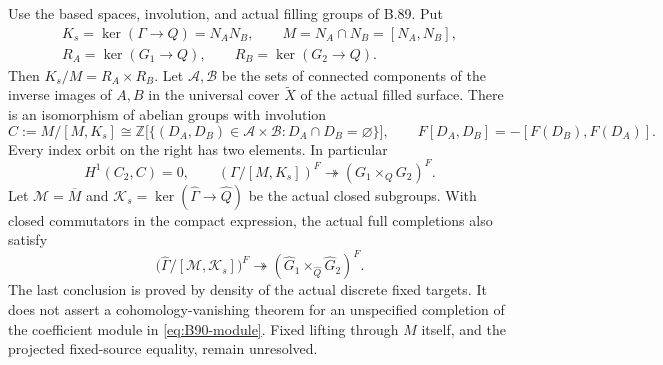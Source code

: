 \label{stmt:B90}
Use the based spaces, involution, and actual filling groups of B.89. Put
\[
 \begin{gathered}
 K_s=\ker(\Gamma\to Q)=N_A N_B,\qquad
 M=N_A\cap N_B=[N_A,N_B],\\
 R_A=\ker(G_1\to Q),\qquad R_B=\ker(G_2\to Q).
 \end{gathered}
\]
Then $K_s/M=R_A\times R_B$. Let $\mathscr A,\mathscr B$ be the
sets of connected components of the inverse images of $A,B$ in the
universal cover $\widetilde X$ of the actual filled surface. There is
an isomorphism of abelian groups with involution
\begin{equation}\label{eq:B90-module}
 C:=M/[M,K_s]\cong
 \mathbb Z\bigl[\{(D_A,D_B)\in\mathscr A\times\mathscr B:
                         D_A\cap D_B=\varnothing\}\bigr],
 \qquad F[D_A,D_B]=-[F(D_B),F(D_A)].
\end{equation}
Every index orbit on the right has two elements. In particular
\begin{equation}\label{eq:B90-H1}
 H^1(C_2,C)=0,
 \qquad
 (\Gamma/[M,K_s])^F\twoheadrightarrow
                  (G_1\times_QG_2)^F.
\end{equation}
Let $\mathcal M=\overline M$ and
$\mathcal K_s=\ker(\widehat\Gamma\to\widehat Q)$ be the actual
closed subgroups. With closed commutators in the compact expression,
the actual full completions also satisfy
\begin{equation}\label{eq:B90-compact}
 \bigl(\widehat\Gamma/[\mathcal M,\mathcal K_s]\bigr)^F
       \twoheadrightarrow
       (\widehat G_1\times_{\widehat Q}\widehat G_2)^F.
\end{equation}
The last conclusion is proved by density of the actual discrete fixed
targets. It does not assert a cohomology-vanishing theorem for an
unspecified completion of the coefficient module in
\eqref{eq:B90-module}. Fixed lifting through $M$ itself, and the
projected fixed-source equality, remain unresolved.

